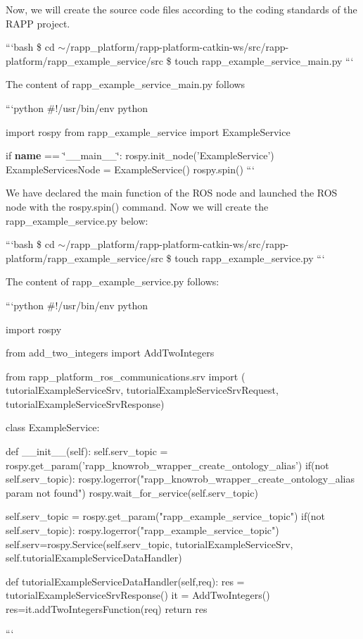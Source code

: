 Now, we will create the source code files according to the coding standards of the R\-A\-P\-P project.

```bash \$ cd $\sim$/rapp\-\_\-platform/rapp-\/platform-\/catkin-\/ws/src/rapp-\/platform/rapp\-\_\-example\-\_\-service/src \$ touch rapp\-\_\-example\-\_\-service\-\_\-main.\-py ```

The content of {\ttfamily rapp\-\_\-example\-\_\-service\-\_\-main.\-py} follows

```python \#!/usr/bin/env python

import rospy from rapp\-\_\-example\-\_\-service import Example\-Service

if {\bfseries name} == \char`\"{}\-\_\-\-\_\-main\-\_\-\-\_\-\char`\"{}\-: rospy.\-init\-\_\-node('Example\-Service') Example\-Services\-Node = Example\-Service() rospy.\-spin() ```

We have declared the main function of the R\-O\-S node and launched the R\-O\-S node with the rospy.\-spin() command. Now we will create the {\ttfamily rapp\-\_\-example\-\_\-service.\-py} below\-:

```bash \$ cd $\sim$/rapp\-\_\-platform/rapp-\/platform-\/catkin-\/ws/src/rapp-\/platform/rapp\-\_\-example\-\_\-service/src \$ touch rapp\-\_\-example\-\_\-service.\-py ```

The content of {\ttfamily rapp\-\_\-example\-\_\-service.\-py} follows\-:

```python \#!/usr/bin/env python

import rospy

from add\-\_\-two\-\_\-integers import Add\-Two\-Integers

from rapp\-\_\-platform\-\_\-ros\-\_\-communications.\-srv import ( tutorial\-Example\-Service\-Srv, tutorial\-Example\-Service\-Srv\-Request, tutorial\-Example\-Service\-Srv\-Response)

class Example\-Service\-: \begin{DoxyVerb}def __init__(self):
    self.serv_topic = rospy.get_param('rapp_knowrob_wrapper_create_ontology_alias')
    if(not self.serv_topic):
        rospy.logerror("rapp_knowrob_wrapper_create_ontology_alias param not found")
    rospy.wait_for_service(self.serv_topic)

    self.serv_topic = rospy.get_param("rapp_example_service_topic")
    if(not self.serv_topic):
        rospy.logerror("rapp_example_service_topic")
    self.serv=rospy.Service(self.serv_topic, tutorialExampleServiceSrv, self.tutorialExampleServiceDataHandler)

def tutorialExampleServiceDataHandler(self,req):
    res = tutorialExampleServiceSrvResponse()
    it = AddTwoIntegers()
    res=it.addTwoIntegersFunction(req)
    return res
\end{DoxyVerb}
 ```

